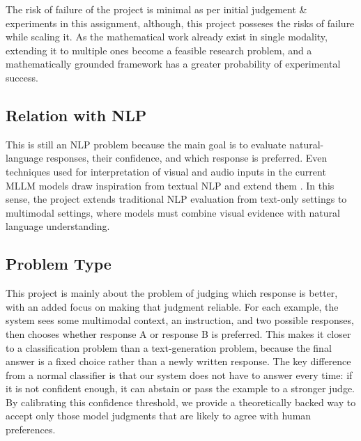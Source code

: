 \documentclass[11pt,a4paper]{article}
\begin{document}
The risk of failure of the project is minimal as per initial judgement \& experiments in this assignment, although, this project posseses the risks of failure while scaling it. As the mathematical work already exist in single modality, extending it to multiple ones become a feasible research problem, and a mathematically grounded framework has a greater probability of experimental success. 

\subsection{Relation with NLP}

This is still an NLP problem because the main goal is to evaluate natural-language responses, their confidence, and which response is preferred. Even techniques used for interpretation of visual and audio inputs in the current MLLM models draw inspiration from textual NLP and extend them \cite{YAO2026116569}. In this sense, the project extends traditional NLP evaluation from text-only settings to multimodal settings, where models must combine visual evidence with natural language understanding.


\subsection{Problem Type}

This project is mainly about the problem of judging which response is better, with an added focus on making that judgment reliable. For each example, the system sees some multimodal context, an instruction, and two possible responses, then chooses whether response A or response B is preferred. This makes it closer to a classification problem than a text-generation problem, because the final answer is a fixed choice rather than a newly written response. 
The key difference from a normal classifier is that our system does not have to answer every time: if it is not confident enough, it can abstain or pass the example to a stronger judge. By calibrating this confidence threshold, we provide a theoretically backed way to accept only those model judgments that are likely to agree with human preferences.
\end{document}

